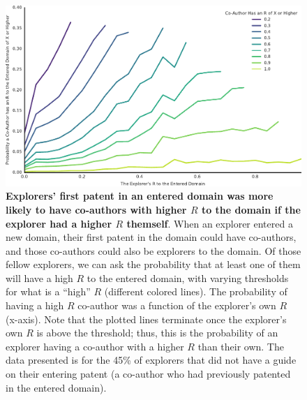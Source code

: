 \documentclass{dsj}
\begin{document}
\begin{figure}%
\includegraphics[width=1.3\columnwidth]{figs/p(Co-Author_R_Greater_than_X)_by_R.pdf} 
\caption{\textbf{Explorers' first patent in an entered domain was more likely to have co-authors with higher $R$ to the domain if the explorer had a higher $R$ themself}. When an explorer entered a new domain, their first patent in the domain could have co-authors, and those co-authors could also be explorers to the domain. Of those fellow explorers, we can ask the probability that at least one of them will have a high $R$ to the entered domain, with varying thresholds for what is a ``high'' $R$ (different colored lines). The probability of having a high $R$ co-author was a function of the explorer's own $R$ (x-axis). Note that the plotted lines terminate once the explorer's own $R$ is above the threshold; thus, this is the probability of an explorer having a co-author with a higher $R$ than their own. The data presented is for the 45\% of explorers that did not have a guide on their entering patent (a co-author who had previously patented in the entered domain).}\label{p(Co-Author_R_Greater_than_X)_by_R}
\end{figure}
\end{document}
